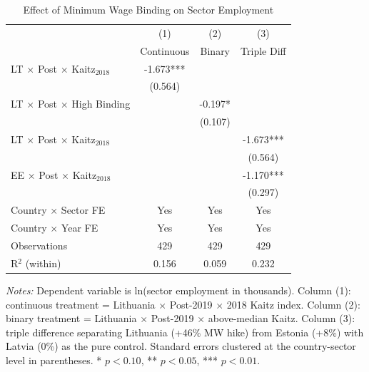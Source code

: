 \begin{table}[H]
\centering
\caption{Effect of Minimum Wage Binding on Sector Employment}
\label{tab:main}
\begin{threeparttable}
\begin{tabular}{lccc}
\toprule
& (1) & (2) & (3) \\
& Continuous & Binary & Triple Diff \\
\midrule
LT $\times$ Post $\times$ Kaitz$_{2018}$ & -1.673*** & & \\
& (0.564) & & \\
LT $\times$ Post $\times$ High Binding & & -0.197* & \\
& & (0.107) & \\
LT $\times$ Post $\times$ Kaitz$_{2018}$ & & & -1.673*** \\
& & & (0.564) \\
EE $\times$ Post $\times$ Kaitz$_{2018}$ & & & -1.170*** \\
& & & (0.297) \\
\midrule
Country $\times$ Sector FE & Yes & Yes & Yes \\
Country $\times$ Year FE & Yes & Yes & Yes \\
Observations & 429 & 429 & 429 \\
R$^2$ (within) & 0.156 & 0.059 & 0.232 \\
\bottomrule
\end{tabular}
\begin{tablenotes}[flushleft]
\small
\item \textit{Notes:} Dependent variable is ln(sector employment in thousands). Column (1): continuous treatment = Lithuania $\times$ Post-2019 $\times$ 2018 Kaitz index. Column (2): binary treatment = Lithuania $\times$ Post-2019 $\times$ above-median Kaitz. Column (3): triple difference separating Lithuania (+46\% MW hike) from Estonia (+8\%) with Latvia (0\%) as the pure control. Standard errors clustered at the country-sector level in parentheses. * $p<0.10$, ** $p<0.05$, *** $p<0.01$.
\end{tablenotes}
\end{threeparttable}
\end{table}
